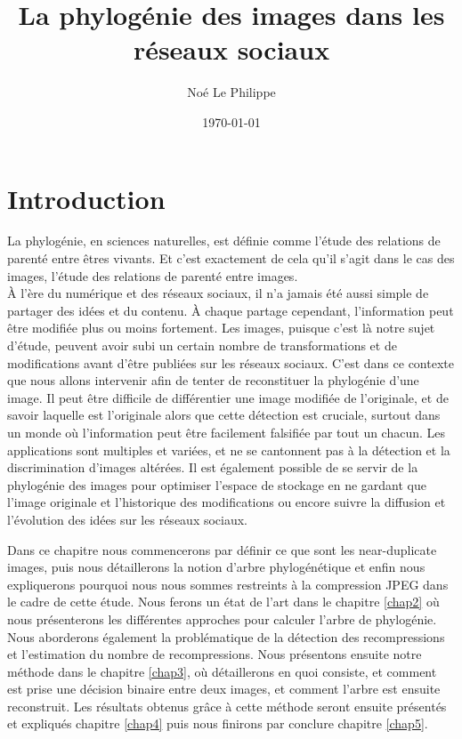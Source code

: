 \documentclass[utf8,final]{stageM2R} %
\author{Noé Le Philippe}
\title{La phylogénie des images dans les réseaux sociaux}
\date{\today}
\begin{document}
   
\frontmatter  %
\maketitle    %
\cleardoublepage   
\tableofcontents %
\mainmatter  %



\chapter{Introduction}
La phylogénie, en sciences naturelles, est définie comme l'étude des relations de parenté entre êtres vivants. Et c'est exactement de cela qu'il s'agit dans le cas des images, l'étude des relations de parenté entre images. \autocite{phylogeny} \\
À l'ère du numérique et des réseaux sociaux, il n'a jamais été aussi simple de partager des idées et du contenu. À chaque partage cependant, l'information peut être modifiée plus ou moins fortement. Les images, puisque c'est là notre sujet d'étude, peuvent avoir subi un certain nombre de transformations et de modifications avant d'être publiées sur les réseaux sociaux. C'est dans ce contexte que nous allons intervenir afin de tenter de reconstituer la phylogénie d'une image. Il peut être difficile de différentier une image modifiée de l'originale, et de savoir laquelle est l'originale alors que cette détection est cruciale, surtout dans un monde où l'information peut être facilement falsifiée par tout un chacun. Les applications sont multiples et variées, et ne se cantonnent pas à la détection et la discrimination d'images altérées. Il est également possible de se servir de la phylogénie des images pour optimiser l'espace de stockage en ne gardant que l'image originale et l'historique des modifications ou encore suivre la diffusion et l'évolution des idées sur les réseaux sociaux. 

Dans ce chapitre nous commencerons par définir ce que sont les near-duplicate images, puis nous détaillerons la notion d'arbre phylogénétique et enfin nous expliquerons pourquoi nous nous sommes restreints à la compression JPEG dans le cadre de cette étude. Nous ferons un état de l'art dans le chapitre \ref{chap2} où nous présenterons les différentes approches pour calculer l'arbre de phylogénie. Nous aborderons également la problématique de la détection des recompressions et l'estimation du nombre de recompressions. Nous présentons ensuite notre méthode dans le chapitre \ref{chap3}, où détaillerons en quoi consiste, et comment est prise une décision binaire entre deux images, et comment l'arbre est ensuite reconstruit. Les résultats obtenus grâce à cette méthode seront ensuite présentés et expliqués chapitre \ref{chap4} puis nous finirons par conclure chapitre \ref{chap5}.
\end{document}
